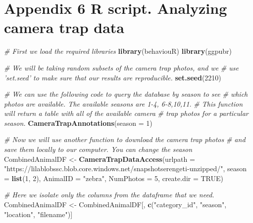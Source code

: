 \documentclass[]{book}
\newenvironment{Shaded}{\begin{snugshade}}{\end{snugshade}}
\newcommand{\CommentTok}[1]{\textcolor[rgb]{0.56,0.35,0.01}{\textit{#1}}}
\newcommand{\DataTypeTok}[1]{\textcolor[rgb]{0.13,0.29,0.53}{#1}}
\newcommand{\DecValTok}[1]{\textcolor[rgb]{0.00,0.00,0.81}{#1}}
\newcommand{\KeywordTok}[1]{\textcolor[rgb]{0.13,0.29,0.53}{\textbf{#1}}}
\newcommand{\NormalTok}[1]{#1}
\newcommand{\OtherTok}[1]{\textcolor[rgb]{0.56,0.35,0.01}{#1}}
\newcommand{\StringTok}[1]{\textcolor[rgb]{0.31,0.60,0.02}{#1}}
\begin{document}
\hypertarget{appendix-6-r-script.-analyzing-camera-trap-data}{%
\chapter*{Appendix 6 R script. Analyzing camera trap data}\label{appendix-6-r-script.-analyzing-camera-trap-data}}

\begin{Shaded}
\begin{Highlighting}[]
\CommentTok{# First we load the required libraries}
\KeywordTok{library}\NormalTok{(behaviouR)}
\KeywordTok{library}\NormalTok{(ggpubr)}

\CommentTok{# We will be taking random subsets of the camera trap photos, and we}
\CommentTok{# use 'set.seed' to make sure that our results are reproducible.}
\KeywordTok{set.seed}\NormalTok{(}\DecValTok{2210}\NormalTok{)}

\CommentTok{# We can use the following code to query the database by season to see}
\CommentTok{# which photos are available. The available seasons are 1-4, 6-8,10,11.}
\CommentTok{# This function will return a table with all of the available camera}
\CommentTok{# trap photos for a particular season.}
\KeywordTok{CameraTrapAnnotations}\NormalTok{(}\DataTypeTok{season =} \DecValTok{1}\NormalTok{)}

\CommentTok{# Now we will use another function to download the camera trap photos}
\CommentTok{# and save them locally to our computer.  You can change the season}
\NormalTok{CombinedAnimalDF <-}\StringTok{ }\KeywordTok{CameraTrapDataAccess}\NormalTok{(}\DataTypeTok{urlpath =} \StringTok{"https://lilablobssc.blob.core.windows.net/snapshotserengeti-unzipped/"}\NormalTok{, }
                                         \DataTypeTok{season =} \KeywordTok{list}\NormalTok{(}\DecValTok{1}\NormalTok{, }\DecValTok{2}\NormalTok{), }\DataTypeTok{AnimalID =} \StringTok{"zebra"}\NormalTok{, }\DataTypeTok{NumPhotos =} \DecValTok{5}\NormalTok{, }\DataTypeTok{create.dir =} \OtherTok{TRUE}\NormalTok{)}

\CommentTok{# Here we isolate only the columns from the dataframe that we need.}
\NormalTok{CombinedAnimalDF <-}\StringTok{ }\NormalTok{CombinedAnimalDF[, }\KeywordTok{c}\NormalTok{(}\StringTok{"category_id"}\NormalTok{, }\StringTok{"season"}\NormalTok{, }\StringTok{"location"}\NormalTok{, }
                                         \StringTok{"filename"}\NormalTok{)]}


\end{Highlighting}
\end{Shaded}
\end{document}
